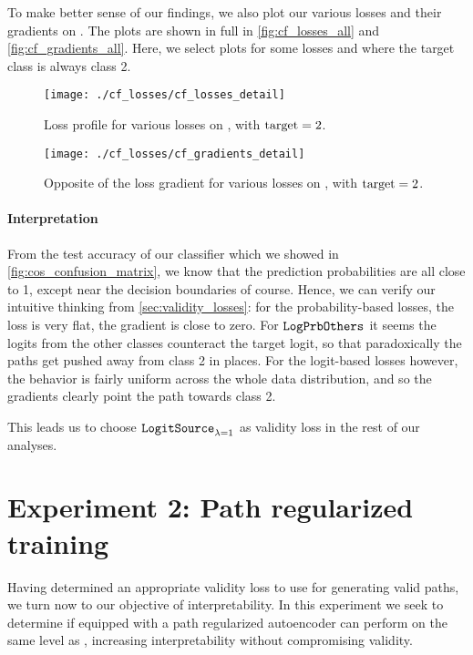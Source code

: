 \documentclass[../main.tex]{subfiles}
\begin{document}
To make better sense of our findings, we also plot our various losses and their gradients on \CakeOnSea.
The plots are shown in full in \autoref{fig:cf_losses_all} and \autoref{fig:cf_gradients_all}.
Here, we select plots for some losses and where the target class is always class 2.


\begin{figure}[htbp]
    \centering
    \texttt{[image: ./cf\_losses/cf\_losses\_detail]}
    \caption{Loss profile for various losses on \CakeOnSea, with ${\mathrm{target} = 2}$.}
    \label{fig:cf_losses_detail}

    \vspace*{\floatsep}%

    \texttt{[image: ./cf\_losses/cf\_gradients\_detail]}
    \caption{Opposite of the loss gradient for various losses on \CakeOnSea, with $\mathrm{target} = 2$.}
    \label{fig:cf_gradients_detail}
\end{figure}

\paragraph{Interpretation}

From the test accuracy of our classifier which we showed in \autoref{fig:cos_confusion_matrix}, we know that the prediction probabilities are all close to 1, except near the decision boundaries of course.
Hence, we can verify our intuitive thinking from \autoref{sec:validity_losses}: for the probability-based losses, the loss is very flat, \ie{} the gradient is close to zero.
For $\mathtt{LogPrbOthers}_{}$ it seems the logits from the other classes counteract the target logit, so that paradoxically the paths get pushed away from class 2 in places.
For the logit-based losses however, the behavior is fairly uniform across the whole data distribution, and so the gradients clearly point the path towards class 2.

This leads us to choose $\mathtt{LogitSource}_{\lambda=1}$ as validity loss in the rest of our analyses.

\section{Experiment 2: Path regularized training}
\label{exp/path_reg}

Having determined an appropriate validity loss to use for generating valid paths, we turn now to our objective of interpretability.
In this experiment we seek to determine if \ls{} equipped with a path regularized autoencoder can perform on the same level as \revise{}, increasing interpretability without compromising validity.
\end{document}
